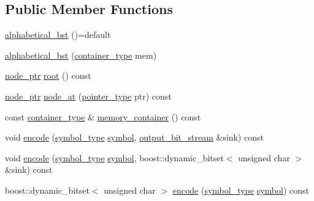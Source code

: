 \subsection*{Public Member Functions}
\begin{DoxyCompactItemize}
\item 
\mbox{\hyperlink{classirk_1_1alphabetical__bst_aa4c4b01aac537a6cf70dba71002e1f7d}{alphabetical\+\_\+bst}} ()=default
\item 
\mbox{\hyperlink{classirk_1_1alphabetical__bst_a21a5c2844dc3bf7bb86e6fa86df2c4c4}{alphabetical\+\_\+bst}} (\mbox{\hyperlink{classirk_1_1alphabetical__bst_aeed9efc6a48ff6d504a608e06223f386}{container\+\_\+type}} mem)
\item 
\mbox{\hyperlink{structirk_1_1alphabetical__bst_1_1node__ptr}{node\+\_\+ptr}} \mbox{\hyperlink{classirk_1_1alphabetical__bst_a28fa90a8d7eec6045a035c44e93a1a13}{root}} () const
\item 
\mbox{\hyperlink{structirk_1_1alphabetical__bst_1_1node__ptr}{node\+\_\+ptr}} \mbox{\hyperlink{classirk_1_1alphabetical__bst_a6330f671acd304c9ca37c3ac6aff3655}{node\+\_\+at}} (\mbox{\hyperlink{classirk_1_1alphabetical__bst_ae689c05ab96a71769e24908d5c73765c}{pointer\+\_\+type}} ptr) const
\item 
const \mbox{\hyperlink{classirk_1_1alphabetical__bst_aeed9efc6a48ff6d504a608e06223f386}{container\+\_\+type}} \& \mbox{\hyperlink{classirk_1_1alphabetical__bst_a273b1d4ffff62f2f8a034d979062e43c}{memory\+\_\+container}} () const
\item 
void \mbox{\hyperlink{classirk_1_1alphabetical__bst_a788eae986e42bf08ba2566927416a367}{encode}} (\mbox{\hyperlink{classirk_1_1alphabetical__bst_a296ccb8fa9fa9dce3b3c3beab0a5ca28}{symbol\+\_\+type}} \mbox{\hyperlink{porter2_8hpp_a04438e24473719aaf288c57833717164}{symbol}}, \mbox{\hyperlink{classirk_1_1output__bit__stream}{output\+\_\+bit\+\_\+stream}} \&sink) const
\item 
void \mbox{\hyperlink{classirk_1_1alphabetical__bst_a921485c053b07711352642fdb638b45e}{encode}} (\mbox{\hyperlink{classirk_1_1alphabetical__bst_a296ccb8fa9fa9dce3b3c3beab0a5ca28}{symbol\+\_\+type}} \mbox{\hyperlink{porter2_8hpp_a04438e24473719aaf288c57833717164}{symbol}}, boost\+::dynamic\+\_\+bitset$<$ unsigned char $>$ \&sink) const
\item 
boost\+::dynamic\+\_\+bitset$<$ unsigned char $>$ \mbox{\hyperlink{classirk_1_1alphabetical__bst_a4d63267c3e8de620411494f5b49fa2a2}{encode}} (\mbox{\hyperlink{classirk_1_1alphabetical__bst_a296ccb8fa9fa9dce3b3c3beab0a5ca28}{symbol\+\_\+type}} \mbox{\hyperlink{porter2_8hpp_a04438e24473719aaf288c57833717164}{symbol}}) const

\end{DoxyCompactItemize}
